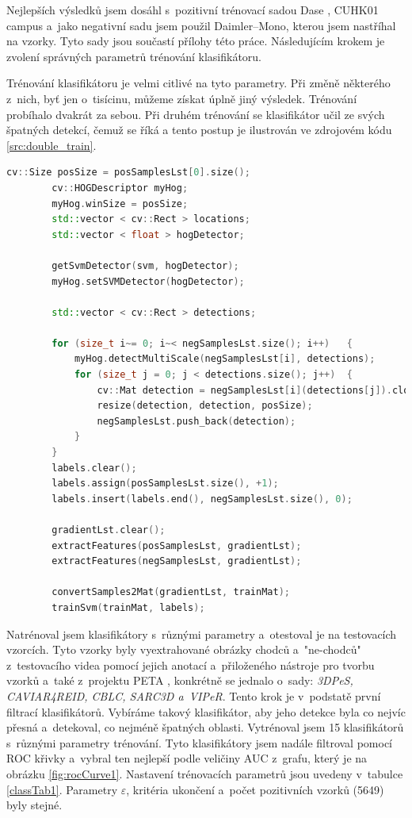 Nejlepších výsledků jsem dosáhl s~pozitivní trénovací sadou Dase \cite{sudipdas}, CUHK01 campus \cite{cuhk} a~jako negativní sadu jsem použil Daimler--Mono\cite{daimler}, kterou jsem nastříhal na vzorky. Tyto sady jsou součastí přílohy této práce. Následujícím krokem je zvolení správných parametrů trénování klasifikátoru. 

Trénování klasifikátoru je velmi citlivé na tyto parametry. Při změně některého z~nich, byť jen o~tisícinu, můžeme získat úplně jiný výsledek. Trénování probíhalo dvakrát za sebou. Při druhém trénování se klasifikátor učil ze svých špatných detekcí, čemuž se říká  \cite{bootstrap} a tento postup je ilustrován ve zdrojovém kódu \ref{src:double_train}.
\newpage

\begin{lstlisting}[label=src:double_train, language=cpp, caption=Bootstrapping]
		cv::Size posSize = posSamplesLst[0].size();
		cv::HOGDescriptor myHog;
		myHog.winSize = posSize;
		std::vector < cv::Rect > locations;
		std::vector < float > hogDetector;
		
		getSvmDetector(svm, hogDetector);
		myHog.setSVMDetector(hogDetector);

		std::vector < cv::Rect > detections;

		for (size_t i~= 0; i~< negSamplesLst.size(); i++)	{
			myHog.detectMultiScale(negSamplesLst[i], detections);
			for (size_t j = 0; j < detections.size(); j++)	{
				cv::Mat detection = negSamplesLst[i](detections[j]).clone();
				resize(detection, detection, posSize);
				negSamplesLst.push_back(detection);
			}
		}
		labels.clear();
		labels.assign(posSamplesLst.size(), +1);
		labels.insert(labels.end(), negSamplesLst.size(), 0);

		gradientLst.clear();
		extractFeatures(posSamplesLst, gradientLst);
		extractFeatures(negSamplesLst, gradientLst);

		convertSamples2Mat(gradientLst, trainMat);
		trainSvm(trainMat, labels);
\end{lstlisting}

Natrénoval jsem klasifikátory s~různými parametry a~otestoval je na testovacích vzorcích. Tyto vzorky byly vyextrahované obrázky chodců a~"ne-chodců" z~testovacího videa pomocí jejich anotací a~přiloženého nástroje pro tvorbu vzorků a~také z~projektu PETA \cite{peta}, konkrétně se jednalo o~sady: \textit{3DPeS, CAVIAR4REID, CBLC, SARC3D a~VIPeR}. Tento krok je v~podstatě první filtrací klasifikátorů. Vybíráme takový klasifikátor, aby jeho detekce byla co nejvíc přesná a~detekoval, co nejméně špatných oblasti. Vytrénoval jsem 15 klasifikátorů s~různými parametry trénování. Tyto klasifikátory jsem nadále filtroval pomocí ROC křivky a~vybral ten nejlepší podle veličiny AUC z~grafu, který je na obrázku \ref{fig:rocCurve1}. Nastavení trénovacích parametrů jsou uvedeny v~tabulce \ref{classTab1}. Parametry $\varepsilon$, kritéria ukončení a~počet pozitivních vzorků (5649) byly stejné.

